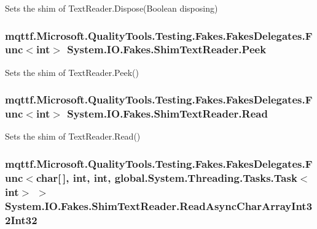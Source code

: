 Sets the shim of Text\-Reader.\-Dispose(\-Boolean disposing)

\hypertarget{class_system_1_1_i_o_1_1_fakes_1_1_shim_text_reader_acde933b116160ca34ed160c4011143e1}{
\subsubsection[{Peek}]{\setlength{\rightskip}{0pt plus 5cm}mqttf.\-Microsoft.\-Quality\-Tools.\-Testing.\-Fakes.\-Fakes\-Delegates.\-Func$<$int$>$ System.\-I\-O.\-Fakes.\-Shim\-Text\-Reader.\-Peek\hspace{0.3cm}{\ttfamily [set]}}}\label{class_system_1_1_i_o_1_1_fakes_1_1_shim_text_reader_acde933b116160ca34ed160c4011143e1}


Sets the shim of Text\-Reader.\-Peek()

\hypertarget{class_system_1_1_i_o_1_1_fakes_1_1_shim_text_reader_aa4a42c020e680fc8175de8fa91d558c8}{
\subsubsection[{Read}]{\setlength{\rightskip}{0pt plus 5cm}mqttf.\-Microsoft.\-Quality\-Tools.\-Testing.\-Fakes.\-Fakes\-Delegates.\-Func$<$int$>$ System.\-I\-O.\-Fakes.\-Shim\-Text\-Reader.\-Read\hspace{0.3cm}{\ttfamily [set]}}}\label{class_system_1_1_i_o_1_1_fakes_1_1_shim_text_reader_aa4a42c020e680fc8175de8fa91d558c8}


Sets the shim of Text\-Reader.\-Read()

\hypertarget{class_system_1_1_i_o_1_1_fakes_1_1_shim_text_reader_a8a4979b0a6b0761dfc381a694c1d3cf9}{
\subsubsection[{Read\-Async\-Char\-Array\-Int32\-Int32}]{\setlength{\rightskip}{0pt plus 5cm}mqttf.\-Microsoft.\-Quality\-Tools.\-Testing.\-Fakes.\-Fakes\-Delegates.\-Func$<$char\mbox{[}$\,$\mbox{]}, int, int, global.\-System.\-Threading.\-Tasks.\-Task$<$int$>$ $>$ System.\-I\-O.\-Fakes.\-Shim\-Text\-Reader.\-Read\-Async\-Char\-Array\-Int32\-Int32\hspace{0.3cm}{\ttfamily [set]}}}\label{class_system_1_1_i_o_1_1_fakes_1_1_shim_text_reader_a8a4979b0a6b0761dfc381a694c1d3cf9}


